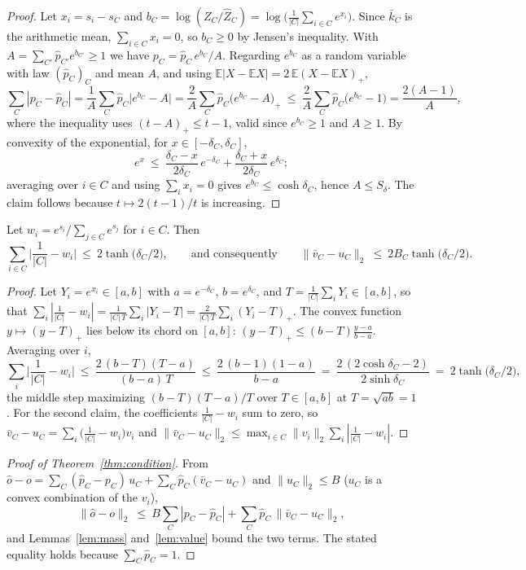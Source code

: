 \begin{proof}
Let $x_i = s_i - s_C$ and
$b_C = \log (Z_C / \hat Z_C) = \log\big( \frac{1}{|C|} \sum_{i \in C} e^{x_i} \big)$.
Since $\bar k_C$ is the arithmetic mean, $\sum_{i\in C} x_i = 0$, so $b_C \ge 0$ by
Jensen's inequality. With $A = \sum_{C'} \hat p_{C'} e^{b_{C'}} \ge 1$ we have
$p_C = \hat p_C\, e^{b_C} / A$. Regarding $e^{b_C}$ as a random variable with law
$(\hat p_C)_C$ and mean $A$, and using
$\mathbb E |X - \mathbb E X| = 2\, \mathbb E (X - \mathbb E X)_+$,
\[
\sum_C |p_C - \hat p_C|
= \frac{1}{A} \sum_C \hat p_C \big| e^{b_C} - A \big|
= \frac{2}{A} \sum_C \hat p_C \big( e^{b_C} - A \big)_+
\ \le\ \frac{2}{A} \sum_C \hat p_C \big( e^{b_C} - 1 \big)
= \frac{2(A-1)}{A},
\]
where the inequality uses $(t - A)_+ \le t - 1$, valid since $e^{b_C} \ge 1$
and $A \ge 1$.
By convexity of the exponential, for $x \in [-\delta_C, \delta_C]$,
\[
e^{x} \ \le\ \frac{\delta_C - x}{2\delta_C}\, e^{-\delta_C}
           + \frac{\delta_C + x}{2\delta_C}\, e^{\delta_C};
\]
averaging over $i \in C$ and using $\sum_i x_i = 0$ gives
$e^{b_C} \le \cosh \delta_C$, hence $A \le S_\delta$. The claim follows because
$t \mapsto 2(t-1)/t$ is increasing.
\end{proof}

\begin{lemma}[value]\label{lem:value}
Let $w_i = e^{s_i} / \sum_{j \in C} e^{s_j}$ for $i \in C$. Then
\[
\sum_{i\in C} \Big| \frac{1}{|C|} - w_i \Big| \ \le\ 2 \tanh\!\big(\delta_C/2\big),
\qquad\text{and consequently}\qquad
\|\bar v_C - u_C\|_2 \ \le\ 2 B_C \tanh\!\big(\delta_C/2\big).
\]
\end{lemma}

\begin{proof}
Let $Y_i = e^{x_i} \in [a, b]$ with $a = e^{-\delta_C}$, $b = e^{\delta_C}$, and
$T = \frac{1}{|C|} \sum_i Y_i \in [a, b]$, so that
$\sum_i |\frac{1}{|C|} - w_i| = \frac{1}{|C|\,T} \sum_i |Y_i - T|
= \frac{2}{|C|\,T} \sum_i (Y_i - T)_+$.
The convex function $y \mapsto (y - T)_+$ lies below its chord on $[a, b]$:
$(y - T)_+ \le (b - T) \frac{y - a}{b - a}$. Averaging over $i$,
\[
\sum_{i} \Big| \frac{1}{|C|} - w_i \Big|
\ \le\ \frac{2\,(b - T)(T - a)}{(b - a)\, T}
\ \le\ \frac{2\,(b - 1)(1 - a)}{b - a}
\ =\ \frac{2\,(2\cosh\delta_C - 2)}{2 \sinh \delta_C}
\ =\ 2 \tanh\!\big(\delta_C/2\big),
\]
the middle step maximizing $(b - T)(T - a)/T$ over $T \in [a, b]$ at
$T = \sqrt{ab} = 1$.
For the second claim, the coefficients $\frac{1}{|C|} - w_i$ sum to zero, so
$\bar v_C - u_C = \sum_i \big( \frac{1}{|C|} - w_i \big) v_i$ and
$\|\bar v_C - u_C\|_2 \le \max_{i \in C} \|v_i\|_2 \sum_i |\frac{1}{|C|} - w_i|$.
\end{proof}

\begin{proof}[Proof of Theorem~\ref{thm:condition}]
From $\hat o - o = \sum_C (\hat p_C - p_C)\, u_C + \sum_C \hat p_C (\bar v_C - u_C)$
and $\|u_C\|_2 \le B$ ($u_C$ is a convex combination of the $v_i$),
\[
\|\hat o - o\|_2
\ \le\ B \sum_C |p_C - \hat p_C| + \sum_C \hat p_C\, \|\bar v_C - u_C\|_2,
\]
and Lemmas~\ref{lem:mass} and~\ref{lem:value} bound the two terms. The stated
equality holds because $\sum_C \hat p_C = 1$.
\end{proof}
